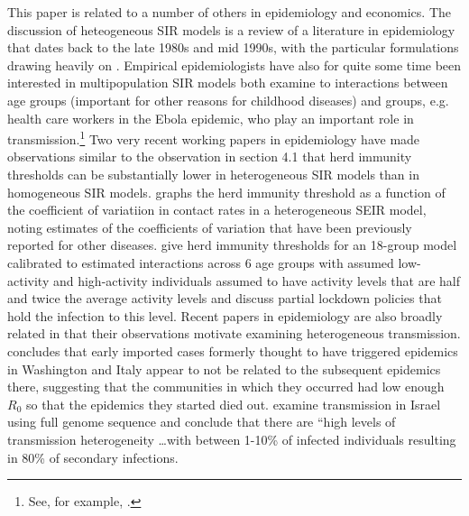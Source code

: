 \documentclass[11pt]{article}
\begin{document}
This paper is related to a number of others in epidemiology and economics. The discussion of heteogeneous SIR models
is a review of a literature in epidemiology that dates back to the late 1980s and mid 1990s, with the particular formulations
drawing heavily on \citet{dushoff1995effects}. Empirical epidemiologists have also for quite some time been 
interested in multipopulation SIR models both examine to interactions between age groups (important for other reasons
for childhood diseases) and groups, e.g. health care workers in the Ebola epidemic, who play an important role in 
transmission.\footnote{See, for example, \citet{britton1998estimation, demiris2005bayesian, lloydsmith2005superspreading, champredon2018two}.}
Two very recent working papers in epidemiology have made observations similar to the observation in section 4.1
that herd immunity thresholds can be substantially lower in heterogeneous SIR models than in homogeneous SIR models. 
\citet{gomes2020individual} graphs the herd immunity threshold as a function of the coefficient of variatiion in contact rates in a
heterogeneous SEIR model, noting estimates of the coefficients of variation that have been previously reported for other 
diseases. \citet{britton2020disease} give herd immunity thresholds for an 18-group model calibrated to estimated interactions
across 6 age groups with assumed low-activity and high-activity individuals assumed to have activity levels that are half
and twice the average activity levels and discuss partial lockdown policies that hold the infection to this level. Recent
papers in epidemiology are also broadly related in that their observations motivate examining heterogeneous transmission. \citet{worobey2020emergence}
 concludes that early imported cases formerly thought to have triggered epidemics in Washington
and Italy appear to not be related to the subsequent epidemics there, suggesting that the communities in which they 
occurred had low enough $R_0$ so that the epidemics they started died out. \citet{miller2020full} examine transmission in Israel using full genome sequence and conclude that there are ``high levels of
transmission heterogeneity \ldots with between 1-10\% of infected individuals resulting in 80\% of secondary infections.
\end{document}
